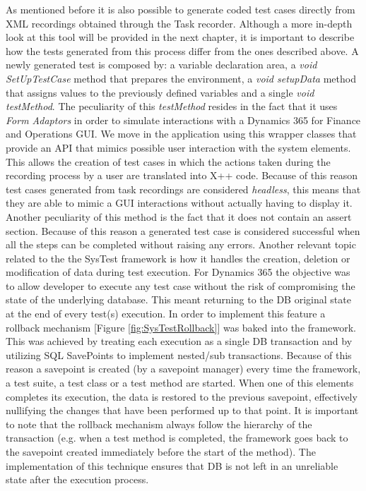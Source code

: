As mentioned before it is also possible to generate coded test cases directly from XML recordings obtained through the Task recorder. Although a more in-depth look at this tool will be provided in the next chapter, it is important to describe how the tests generated from this process differ from the ones described above. 
A newly generated test is composed by: a variable declaration area, a \textit{void SetUpTestCase} method that prepares the environment, a \textit{void setupData} method that assigns values to the previously defined variables and a single \textit{void testMethod}. The peculiarity of this \textit{testMethod} resides in the fact that it uses \textit{Form Adaptors} in order to simulate interactions with a Dynamics 365 for Finance and Operations GUI. We move in the application using this wrapper classes that provide an API that mimics possible user interaction with the system elements. This allows the creation of test cases in which the actions taken during the recording process by a user are translated into X++ code. Because of this reason test cases generated from task recordings are considered \textit{headless}, this means that they are able to mimic a GUI interactions without actually having to display it. Another peculiarity of this method is the fact that it does not contain an assert section. Because of this reason a generated test case is considered successful when all the steps can be completed without raising any errors.
Another relevant topic related to the the SysTest framework is how it handles the creation, deletion or modification of data during test execution. For Dynamics 365 the objective was to allow developer to execute any test case without the risk of compromising the state of the underlying database. This meant returning to the DB original state at the end of every test(s) execution. In order to implement this feature a rollback mechanism [Figure \ref{fig:SysTestRollback}] was baked into the framework. This was achieved by treating each execution as a single DB transaction and by utilizing SQL SavePoints to implement nested/sub transactions. Because of this reason a savepoint is created (by a savepoint manager) every time the framework, a test suite, a test class or a test method are started. When one of this elements completes its execution, the data is restored to the previous savepoint, effectively nullifying the changes that have been performed up to that point. It is important to note that the rollback mechanism always follow the hierarchy of the transaction (e.g. when a test method is completed, the framework goes back to the savepoint created immediately before the start of the method). The implementation of this technique ensures that DB is not left in an unreliable state after the execution process.

